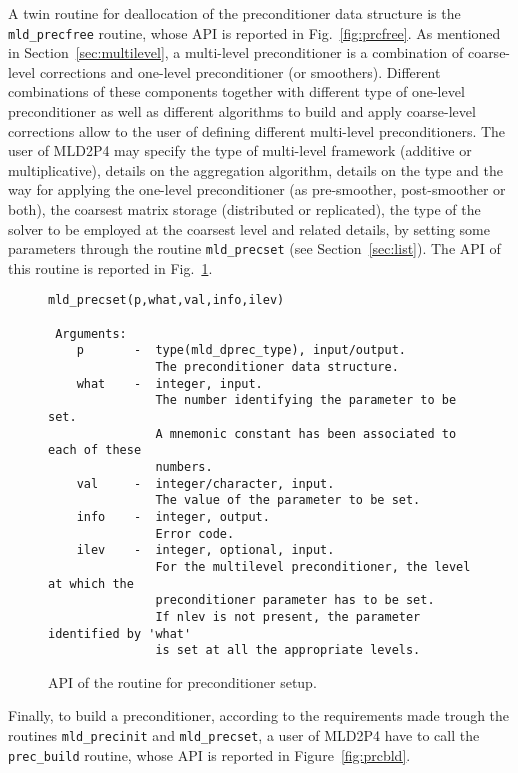 A twin routine for deallocation of the preconditioner data structure is the \verb|mld_precfree| routine, whose API is reported in
Fig.~\ref{fig:prcfree}.
As mentioned in Section~\ref{sec:multilevel}, a multi-level preconditioner is a combination
of coarse-level corrections and one-level preconditioner (or smoothers).
Different combinations of these components together with different type of one-level preconditioner
as well as different algorithms to build and apply coarse-level corrections allow to the user of defining different multi-level
preconditioners.
The user of MLD2P4 may specify the type of multi-level framework (additive or multiplicative), details on the
aggregation algorithm, details on the type and the way for applying the one-level preconditioner
(as pre-smoother, post-smoother or both), the coarsest matrix storage
(distributed or replicated), the type of the solver to be employed at the coarsest level
and related details, by setting some parameters through the routine \verb|mld_precset| (see Section~\ref{sec:list}).
The API of this routine is reported in Fig.~\ref{fig:prcset}.
%
\begin{figure}[h]
\begin{center}
{\small
\begin{verbatim}
mld_precset(p,what,val,info,ilev)

 Arguments:
    p       -  type(mld_dprec_type), input/output.
               The preconditioner data structure.
    what    -  integer, input.
               The number identifying the parameter to be set.
               A mnemonic constant has been associated to each of these
               numbers.
    val     -  integer/character, input.
               The value of the parameter to be set. 
    info    -  integer, output.
               Error code.
    ilev    -  integer, optional, input.
               For the multilevel preconditioner, the level at which the
               preconditioner parameter has to be set. 
               If nlev is not present, the parameter identified by 'what'
               is set at all the appropriate levels.
\end{verbatim}
}
\end{center}
\caption{API of the routine for preconditioner setup.\label{fig:prcset}}
\end{figure}
%
Finally, to build a preconditioner, according to the requirements made trough the routines \verb|mld_precinit| and \verb|mld_precset|,
a user of MLD2P4 have to call the \verb|prec_build| routine, whose API is reported in Figure~\ref{fig:prcbld}.
